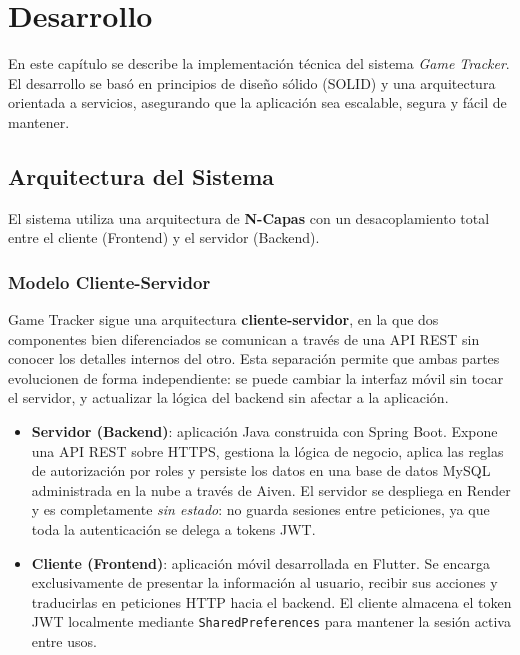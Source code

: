 
\chapter{Desarrollo}

En este capítulo se describe la implementación técnica del sistema \textit{Game Tracker}. El desarrollo se basó en principios de diseño sólido (SOLID) y una arquitectura orientada a servicios, asegurando que la aplicación sea escalable, segura y fácil de mantener.

\section{Arquitectura del Sistema}

El sistema utiliza una arquitectura de \textbf{N-Capas} con un desacoplamiento total entre el cliente (Frontend) y el servidor (Backend).

\subsection{Modelo Cliente-Servidor}

Game Tracker sigue una arquitectura \textbf{cliente-servidor}, en la que dos
componentes bien diferenciados se comunican a través de una API REST sin
conocer los detalles internos del otro. Esta separación permite que ambas partes
evolucionen de forma independiente: se puede cambiar la interfaz móvil sin tocar
el servidor, y actualizar la lógica del backend sin afectar a la aplicación.

\begin{itemize}
    \item \textbf{Servidor (Backend)}: aplicación Java construida con Spring
    Boot. Expone una API REST sobre HTTPS, gestiona la lógica de negocio,
    aplica las reglas de autorización por roles y persiste los datos en una
    base de datos MySQL administrada en la nube a través de Aiven. El servidor
    se despliega en Render y es completamente \textit{sin estado}: no guarda
    sesiones entre peticiones, ya que toda la autenticación se delega a
    tokens JWT.

    \item \textbf{Cliente (Frontend)}: aplicación móvil desarrollada en
    Flutter. Se encarga exclusivamente de presentar la información al usuario,
    recibir sus acciones y traducirlas en peticiones HTTP hacia el backend.
    El cliente almacena el token JWT localmente mediante
    \texttt{SharedPreferences} para mantener la sesión activa entre usos.
\end{itemize}

